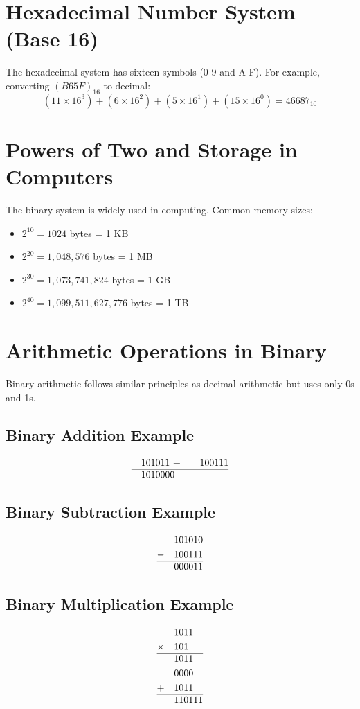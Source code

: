 \documentclass{article}
\begin{document}
\section{Hexadecimal Number System (Base 16)}
The hexadecimal system has sixteen symbols (0-9 and A-F). For example, converting $(B65F)_{16}$ to decimal:
\begin{equation}
  (11 \times 16^3) + (6 \times 16^2) + (5 \times 16^1) + (15 \times 16^0) = 46687_{10}
\end{equation}

\section{Powers of Two and Storage in Computers}
The binary system is widely used in computing. Common memory sizes:
\begin{itemize}
    \item $2^{10} = 1024$ bytes = 1 KB
    \item $2^{20} = 1,048,576$ bytes = 1 MB
    \item $2^{30} = 1,073,741,824$ bytes = 1 GB
    \item $2^{40} = 1,099,511,627,776$ bytes = 1 TB
\end{itemize}

\section{Arithmetic Operations in Binary}
Binary arithmetic follows similar principles as decimal arithmetic but uses only 0s and 1s.

\subsection{Binary Addition Example}
\begin{align*}
  &\quad 101011 \
+ &\quad 100111 \\
\hline
  &\quad 1010000
\end{align*}

\subsection{Binary Subtraction Example}
\begin{align*}
  &\quad 101010 \\
- &\quad 100111 \\
\hline
  &\quad 000011
\end{align*}

\subsection{Binary Multiplication Example}
\begin{align*}
  &\quad 1011 \\
\times &\quad 101 \\
\hline
  &\quad 1011 \\
  &\quad 0000 \\
+ &\quad 1011 \\
\hline
  &\quad 110111
\end{align*}
\end{document}
